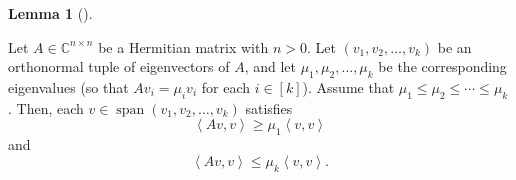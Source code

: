 \documentclass[numbers=enddot,12pt,final,onecolumn,notitlepage]{scrartcl}%
\numberwithin{exer}{subsection}
\theoremstyle{definition}
\newtheorem{lem}[theo]{Lemma}
\newenvironment{lemma}[1][]
{\begin{lem}[#1]\begin{leftbar}}
{\end{leftbar}\end{lem}}
\begin{document}
\begin{lemma}
\label{lem.herm.cour-fish-lem}Let $A\in\mathbb{C}^{n\times n}$ be a Hermitian
matrix with $n>0$. Let $\left(  v_{1},v_{2},\ldots,v_{k}\right)  $ be an
orthonormal tuple of eigenvectors of $A$, and let $\mu_{1},\mu_{2},\ldots
,\mu_{k}$ be the corresponding eigenvalues (so that $Av_{i}=\mu_{i}v_{i}$ for
each $i\in\left[  k\right]  $). Assume that $\mu_{1}\leq\mu_{2}\leq\cdots
\leq\mu_{k}$. Then, each $v\in\operatorname*{span}\left(  v_{1},v_{2}%
,\ldots,v_{k}\right)  $ satisfies%
\begin{equation}
\left\langle Av,v\right\rangle \geq\mu_{1}\left\langle v,v\right\rangle
\label{eq.lem.herm.cour-fish-lem.geq}%
\end{equation}
and%
\begin{equation}
\left\langle Av,v\right\rangle \leq\mu_{k}\left\langle v,v\right\rangle
.\label{eq.lem.herm.cour-fish-lem.leq}%
\end{equation}

\end{lemma}
\end{document}
